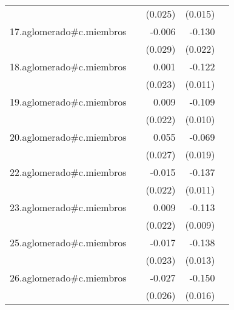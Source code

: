 {\begin{longtable}{l*{4}{D{.}{.}{-1}}}
            &                     &     (0.025)         &     (0.015)         &                     \\
\addlinespace
17.aglomerado#c.miembros&                     &      -0.006         &      -0.130\sym{***}&                     \\
            &                     &     (0.029)         &     (0.022)         &                     \\
\addlinespace
18.aglomerado#c.miembros&                     &       0.001         &      -0.122\sym{***}&                     \\
            &                     &     (0.023)         &     (0.011)         &                     \\
\addlinespace
19.aglomerado#c.miembros&                     &       0.009         &      -0.109\sym{***}&                     \\
            &                     &     (0.022)         &     (0.010)         &                     \\
\addlinespace
20.aglomerado#c.miembros&                     &       0.055\sym{*}  &      -0.069\sym{***}&                     \\
            &                     &     (0.027)         &     (0.019)         &                     \\
\addlinespace
22.aglomerado#c.miembros&                     &      -0.015         &      -0.137\sym{***}&                     \\
            &                     &     (0.022)         &     (0.011)         &                     \\
\addlinespace
23.aglomerado#c.miembros&                     &       0.009         &      -0.113\sym{***}&                     \\
            &                     &     (0.022)         &     (0.009)         &                     \\
\addlinespace
25.aglomerado#c.miembros&                     &      -0.017         &      -0.138\sym{***}&                     \\
            &                     &     (0.023)         &     (0.013)         &                     \\
\addlinespace
26.aglomerado#c.miembros&                     &      -0.027         &      -0.150\sym{***}&                     \\
            &                     &     (0.026)         &     (0.016)         &                     \\

\end{longtable}}
